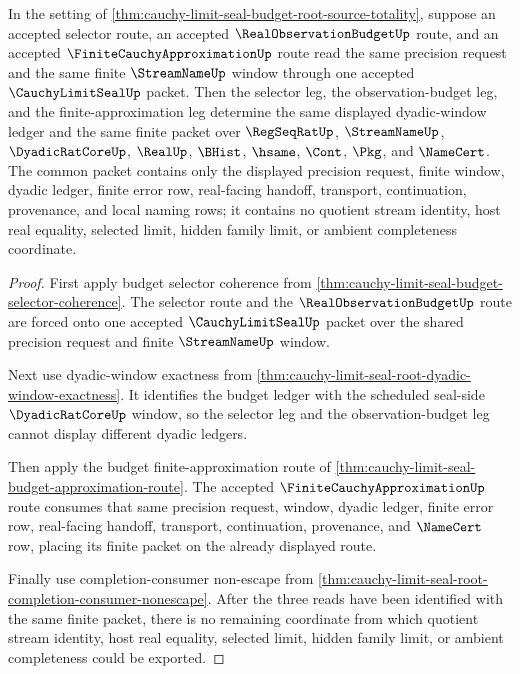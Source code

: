 \begin{theorem}
\label{thm:cauchy-limit-seal-budget-selector-approximation-determinacy}
In the setting of \autoref{thm:cauchy-limit-seal-budget-root-source-totality}, suppose an accepted selector route, an accepted $\RealObservationBudgetUp$ route, and an accepted $\FiniteCauchyApproximationUp$ route read the same precision request and the same finite $\StreamNameUp$ window through one accepted $\CauchyLimitSealUp$ packet. Then the selector leg, the observation-budget leg, and the finite-approximation leg determine the same displayed dyadic-window ledger and the same finite packet over $\RegSeqRatUp$, $\StreamNameUp$, $\DyadicRatCoreUp$, $\RealUp$, $\BHist$, $\hsame$, $\Cont$, $\Pkg$, and $\NameCert$. The common packet contains only the displayed precision request, finite window, dyadic ledger, finite error row, real-facing handoff, transport, continuation, provenance, and local naming rows; it contains no quotient stream identity, host real equality, selected limit, hidden family limit, or ambient completeness coordinate.
\end{theorem}
\begin{proof}
First apply budget selector coherence from \autoref{thm:cauchy-limit-seal-budget-selector-coherence}. The selector route and the $\RealObservationBudgetUp$ route are forced onto one accepted $\CauchyLimitSealUp$ packet over the shared precision request and finite $\StreamNameUp$ window.

Next use dyadic-window exactness from \autoref{thm:cauchy-limit-seal-root-dyadic-window-exactness}. It identifies the budget ledger with the scheduled seal-side $\DyadicRatCoreUp$ window, so the selector leg and the observation-budget leg cannot display different dyadic ledgers.

Then apply the budget finite-approximation route of \autoref{thm:cauchy-limit-seal-budget-approximation-route}. The accepted $\FiniteCauchyApproximationUp$ route consumes that same precision request, window, dyadic ledger, finite error row, real-facing handoff, transport, continuation, provenance, and $\NameCert$ row, placing its finite packet on the already displayed route.

Finally use completion-consumer non-escape from \autoref{thm:cauchy-limit-seal-root-completion-consumer-nonescape}. After the three reads have been identified with the same finite packet, there is no remaining coordinate from which quotient stream identity, host real equality, selected limit, hidden family limit, or ambient completeness could be exported.
\end{proof}

